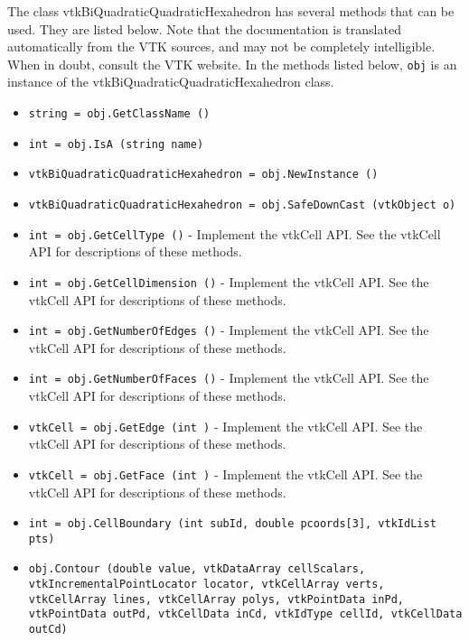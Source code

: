 The class vtkBiQuadraticQuadraticHexahedron has several methods that can be used.
  They are listed below.
Note that the documentation is translated automatically from the VTK sources,
and may not be completely intelligible.  When in doubt, consult the VTK website.
In the methods listed below, \verb|obj| is an instance of the vtkBiQuadraticQuadraticHexahedron class.
\begin{itemize}
\item  \verb|string = obj.GetClassName ()|

\item  \verb|int = obj.IsA (string name)|

\item  \verb|vtkBiQuadraticQuadraticHexahedron = obj.NewInstance ()|

\item  \verb|vtkBiQuadraticQuadraticHexahedron = obj.SafeDownCast (vtkObject o)|

\item  \verb|int = obj.GetCellType ()| -  Implement the vtkCell API. See the vtkCell API for descriptions
 of these methods.

\item  \verb|int = obj.GetCellDimension ()| -  Implement the vtkCell API. See the vtkCell API for descriptions
 of these methods.

\item  \verb|int = obj.GetNumberOfEdges ()| -  Implement the vtkCell API. See the vtkCell API for descriptions
 of these methods.

\item  \verb|int = obj.GetNumberOfFaces ()| -  Implement the vtkCell API. See the vtkCell API for descriptions
 of these methods.

\item  \verb|vtkCell = obj.GetEdge (int )| -  Implement the vtkCell API. See the vtkCell API for descriptions
 of these methods.

\item  \verb|vtkCell = obj.GetFace (int )| -  Implement the vtkCell API. See the vtkCell API for descriptions
 of these methods.

\item  \verb|int = obj.CellBoundary (int subId, double pcoords[3], vtkIdList pts)|

\item  \verb|obj.Contour (double value, vtkDataArray cellScalars, vtkIncrementalPointLocator locator, vtkCellArray verts, vtkCellArray lines, vtkCellArray polys, vtkPointData inPd, vtkPointData outPd, vtkCellData inCd, vtkIdType cellId, vtkCellData outCd)|


\end{itemize}
